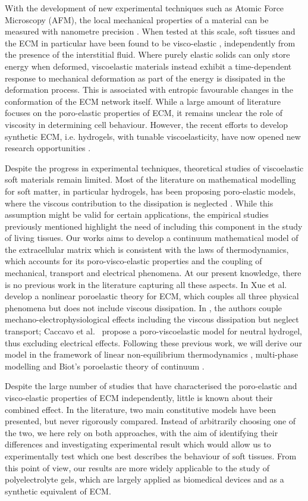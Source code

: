 With the development of new experimental techniques such as Atomic Force Microscopy (AFM), the local mechanical properties of a material can be measured with nanometre precision \cite{viscoporo}. When tested at this scale, soft tissues and the ECM in particular have been found to be visco-elastic \cite{ex5}, independently from the presence of the interstitial fluid. Where purely elastic solids can only store energy when deformed, viscoelastic materials instead exhibit a time-dependent response to mechanical deformation as part of the energy is dissipated in the deformation process. This is associated with entropic favourable changes in the conformation of the ECM network itself. While a large amount of literature focuses on the poro-elastic properties of ECM, it remains unclear the role of viscosity in determining cell behaviour. However, the recent efforts to develop synthetic ECM, i.e. hydrogels, with tunable viscoelasticity, have now opened new research opportunities \cite{viscocell}. 

Despite the progress in experimental techniques, theoretical studies of viscoelastic soft materials remain limited. Most of the literature on mathematical modelling for soft matter, in particular hydrogels, has been proposing poro-elastic models, where the viscous contribution to the dissipation is neglected \cite{Article1}. While this assumption might be valid for certain applications, the empirical studies previously mentioned highlight the need of including this component in the study of living tissues. Our works aims to develop a continuum mathematical model of the extracellular matrix which is consistent with the laws of thermodynamics, which accounts for its poro-visco-elastic properties and the coupling of mechanical, transport and electrical phenomena. At our present knowledge, there is no previous work in the literature capturing all these aspects. In \cite{ecm1,ecm2} Xue et al.~ develop a nonlinear poroelastic theory for ECM, which couples all three physical phenomena but does not include viscous dissipation. In \cite{Jeru}, the authors couple mechano-electrophysiological effects including the viscous dissipation but neglect transport; Caccavo et al.~ \cite{Article1} propose a poro-viscoelastic model for neutral hydrogel, thus excluding electrical effects.  Following these previous work, we will derive our model in the framework of linear non-equilibrium thermodynamics \cite{NET}, multi-phase modelling and Biot's poroelastic theory of continuum \cite{Biot}. 

Despite the large number of studies that have characterised the poro-elastic and visco-elastic properties of ECM independently, little is known about their combined effect. In the literature, two main constitutive models have been presented, but never rigorously compared.  Instead of arbitrarily choosing one of the two, we here rely on both approaches, with the aim of identifying their differences and investigating experimental result which would allow us to experimentally test which one best describes the behaviour of soft tissues. From this point of view, our results are more widely applicable to the study of polyelectrolyte gels, which are largely applied as biomedical devices and as a synthetic equivalent of ECM.

